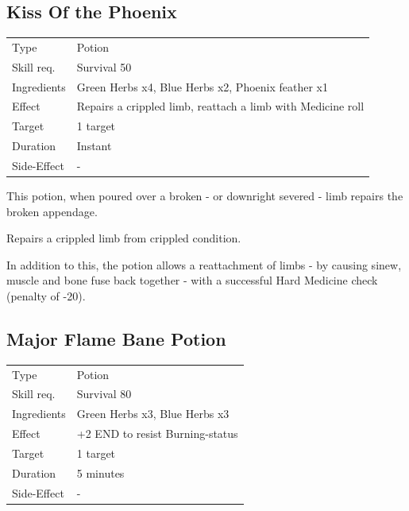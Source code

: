 \documentclass[11pt,a4paper,twocolumn]{book}
\begin{document}
\subsection*{Kiss Of the Phoenix}
{
	\begin{tabu} to 75mm{| X[l,4] | X[l,8] |}
		\hline
		Type 			& Potion 														\\
        Skill req.	    & Survival 50 													\\
        Ingredients     & Green Herbs x4, Blue Herbs x2, Phoenix feather x1				\\
        Effect     		& Repairs a crippled limb, reattach a limb with Medicine roll 	\\
        Target      	& 1 target														\\
        Duration  		& Instant	 													\\
        Side-Effect     & -																\\ \hline
	\end{tabu}
		
}

\medskip

This potion, when poured over a broken - or downright severed - limb repairs the broken appendage.

Repairs a crippled limb from crippled condition.

In addition to this, the potion allows a reattachment of limbs - by causing sinew, muscle and bone fuse back together - with a successful Hard Medicine check (penalty of -20).

\vfill


\subsection*{Major Flame Bane Potion}
{
	\begin{tabu} to 75mm{| X[l,4] | X[l,8] |}
		\hline
		Type 			& Potion 											\\
        Skill req.	    & Survival 80 										\\
        Ingredients     & Green Herbs x3, Blue Herbs x3						\\
        Effect     		& +2 END to resist Burning-status					\\
        Target      	& 1 target											\\
        Duration  		& 5 minutes	 										\\
        Side-Effect     & -													\\ \hline
	\end{tabu}
		
}
\end{document}
